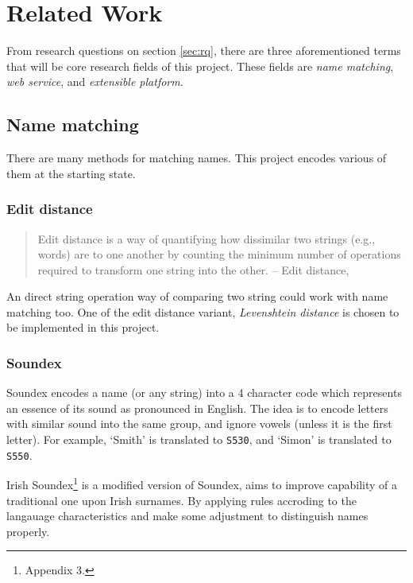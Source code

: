 \chapter{Related Work}
\label{ch:relatedwork}

From research questions on section \ref{sec:rq}, there are three aforementioned
terms that will be core research fields of this project.
These fields are \emph{name matching}, \emph{web service},
and \emph{extensible platform}.

\section{Name matching}

There are many methods for matching names. This project encodes
various of them at the starting state.

\subsection{Edit distance}

\begin{quotation} \noindent
Edit distance is a way of quantifying how dissimilar two strings
(e.g., words) are to one another by counting the minimum number
of operations required to transform one string into the other.
-- Edit distance, \citet{editdistance}
\end{quotation}

\noindent An direct string operation way of comparing two string
could work with name matching too. One of the edit distance variant,
\emph{Levenshtein distance} \citep{levenshteindistance}
is chosen to be implemented in this project.

\subsection{Soundex}

Soundex \cite{soundex} encodes a name (or any string) into a 4 character code
which represents an essence of its sound as pronounced in English.
The idea is to encode letters with similar sound into the same group,
and ignore vowels (unless it is the first letter).
For example, `Smith' is translated to \texttt{S530}, and
`Simon' is translated to \texttt{S550}.

Irish Soundex\footnote{\cite{adamw} Appendix 3.}
is a modified version of Soundex,
aims to improve capability of a traditional one upon Irish surnames.
By applying rules accroding to the langauage characteristics and
make some adjustment to distinguish names properly.


